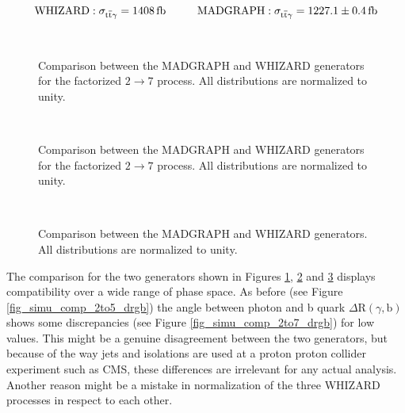 \begin{equation}
\mathrm{WHIZARD: }\; \sigma_{\ttgamma} = \SI{1408}{\femto \barn} \hspace{1.cm} \mathrm{MADGRAPH: }\; \sigma_{\ttgamma} = \SI{1227.1 \pm 0.4}{\femto \barn}
\label{eq_simu_2to7_cross}
\end{equation}



\begin{figure}
\centering
  \\
  \caption{Comparison between the MADGRAPH and WHIZARD generators for the factorized $2 \to 7$ process. All distributions are normalized to unity.}
  \label{fig_simu_comp_2to7_1}
\end{figure}

\begin{figure}
\centering
  \\
  \caption{Comparison between the MADGRAPH and WHIZARD generators for the factorized $2 \to 7$ process. All distributions are normalized to unity.}
  \label{fig_simu_comp_2to7_2}
\end{figure}
\begin{figure}
\centering
  \\
  \caption{Comparison between the MADGRAPH and WHIZARD generators. All distributions are normalized to unity.}
  \label{fig_simu_comp_2to7_3}
\end{figure}

The comparison for the two generators shown in Figures \ref{fig_simu_comp_2to7_1}, \ref{fig_simu_comp_2to7_2} and \ref{fig_simu_comp_2to7_3} displays compatibility over a wide range of phase space. As before (see Figure \ref{fig_simu_comp_2to5_drgb}) the angle between photon and b quark $\Delta \mathrm{R}(\gamma,\mathrm{b})$ shows some discrepancies (see Figure \ref{fig_simu_comp_2to7_drgb}) for low values. This might be a genuine disagreement between the two generators, but because of the way jets and isolations are used at a proton proton collider experiment such as CMS, these differences are irrelevant for any actual analysis.
Another reason might be a mistake in normalization of the three WHIZARD processes in respect to each other. \\

